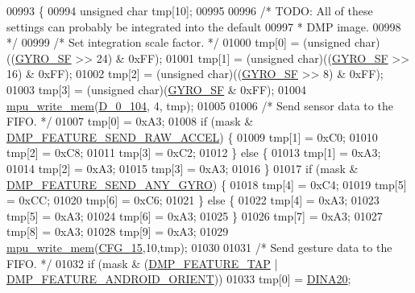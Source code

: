 \begin{DoxyCode}
00993 \{
00994     \textcolor{keywordtype}{unsigned} \textcolor{keywordtype}{char} tmp[10];
00995 
00996     \textcolor{comment}{/* TODO: All of these settings can probably be integrated into the default}
00997 \textcolor{comment}{     * DMP image.}
00998 \textcolor{comment}{     */}
00999     \textcolor{comment}{/* Set integration scale factor. */}
01000     tmp[0] = (\textcolor{keywordtype}{unsigned} char)((\hyperlink{group___d_r_i_v_e_r_s_gac0325c658f2911bdfc3b44fca31c684f}{GYRO\_SF} >> 24) & 0xFF);
01001     tmp[1] = (\textcolor{keywordtype}{unsigned} char)((\hyperlink{group___d_r_i_v_e_r_s_gac0325c658f2911bdfc3b44fca31c684f}{GYRO\_SF} >> 16) & 0xFF);
01002     tmp[2] = (\textcolor{keywordtype}{unsigned} char)((\hyperlink{group___d_r_i_v_e_r_s_gac0325c658f2911bdfc3b44fca31c684f}{GYRO\_SF} >> 8) & 0xFF);
01003     tmp[3] = (\textcolor{keywordtype}{unsigned} char)(\hyperlink{group___d_r_i_v_e_r_s_gac0325c658f2911bdfc3b44fca31c684f}{GYRO\_SF} & 0xFF);
01004     \hyperlink{group___d_r_i_v_e_r_s_gafea59910bc3dd30ba3356b1c75213a5f}{mpu\_write\_mem}(\hyperlink{group___d_r_i_v_e_r_s_ga5edbce4fdd515aa31a227fb8eaf0151f}{D\_0\_104}, 4, tmp);
01005 
01006     \textcolor{comment}{/* Send sensor data to the FIFO. */}
01007     tmp[0] = 0xA3;
01008     \textcolor{keywordflow}{if} (mask & \hyperlink{group___d_r_i_v_e_r_s_ga9eeb257febe4a305df7ad4cf31dc2755}{DMP\_FEATURE\_SEND\_RAW\_ACCEL}) \{
01009         tmp[1] = 0xC0;
01010         tmp[2] = 0xC8;
01011         tmp[3] = 0xC2;
01012     \} \textcolor{keywordflow}{else} \{
01013         tmp[1] = 0xA3;
01014         tmp[2] = 0xA3;
01015         tmp[3] = 0xA3;
01016     \}
01017     \textcolor{keywordflow}{if} (mask & \hyperlink{group___d_r_i_v_e_r_s_gadda8f4118bd084cfb4fcda3571585c56}{DMP\_FEATURE\_SEND\_ANY\_GYRO}) \{
01018         tmp[4] = 0xC4;
01019         tmp[5] = 0xCC;
01020         tmp[6] = 0xC6;
01021     \} \textcolor{keywordflow}{else} \{
01022         tmp[4] = 0xA3;
01023         tmp[5] = 0xA3;
01024         tmp[6] = 0xA3;
01025     \}
01026     tmp[7] = 0xA3;
01027     tmp[8] = 0xA3;
01028     tmp[9] = 0xA3;
01029     \hyperlink{group___d_r_i_v_e_r_s_gafea59910bc3dd30ba3356b1c75213a5f}{mpu\_write\_mem}(\hyperlink{group___d_r_i_v_e_r_s_ga1fe6e4489855269e7197beb38b07c723}{CFG\_15},10,tmp);
01030 
01031     \textcolor{comment}{/* Send gesture data to the FIFO. */}
01032     \textcolor{keywordflow}{if} (mask & (\hyperlink{group___d_r_i_v_e_r_s_ga87fac39cf95e2c56afdf507a986fa00b}{DMP\_FEATURE\_TAP} | \hyperlink{group___d_r_i_v_e_r_s_gaf2b250fc928390d562f7bd80300ce419}{DMP\_FEATURE\_ANDROID\_ORIENT}))
01033         tmp[0] = \hyperlink{dmp_key_8h_a2b6f6c9e544536e4c10f2a828621b87b}{DINA20};

\end{DoxyCode}
